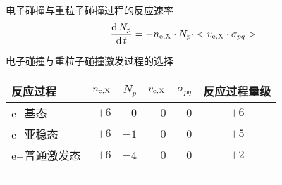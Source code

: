 \begin{CJK*}{UTF8}{kai}
\begin{frame}{电子碰撞与重粒子碰撞过程的反应速率}
	$$
	\frac{{\rm d}\,N_p}{{\rm d}\,t}=-n_{\rm e,X}\cdot N_p\cdot <v_{\rm e,X}\cdot\sigma_{pq}>
	$$
\end{frame}

\begin{frame}{电子碰撞与重粒子碰撞激发过程的选择}
\centering
\begin{table}%
\begin{center}
\begin{tabular}{lrrrrc}\toprule[1.5pt]
反应过程 & $n_{\rm e,X}$ & $N_{p}$ & $v_{\rm e,X}$ & $\sigma_{pq}$ & 反应过程量级\\
\midrule[1pt]
${\rm e-}$基态       & $+6$ & $0$  & $0$  & $0$  & $+6$ \\
${\rm e-}$亚稳态     & $+6$ & $-1$ & $0$  & $0$  & $+5$ \\
${\rm e-}$普通激发态 & $+6$ & $-4$ & $0$  & $0$  & $+2$ \\
\color{gray}{${\rm X-}$基态} & \color{gray}{$+4$} & \color{gray}{$0$}  & \color{gray}{$-3$} & \color{gray}{$-3$} & \color{gray}{$-2$} \\
\color{gray}{${\rm X-}$亚稳态}     & \color{gray}{$+4$} & \color{gray}{$-1$} & \color{gray}{$-3$} & \color{gray}{$-3$} & \color{gray}{$-3$} \\
\color{gray}{${\rm X-}$普通激发态} & \color{gray}{$+4$} & \color{gray}{$-4$} & \color{gray}{$-3$} & \color{gray}{$-3$} & \color{gray}{$-6$} \\
\bottomrule[1.5pt]
\end{tabular}
\end{center}
\end{table}
\end{frame}


\end{CJK*}
